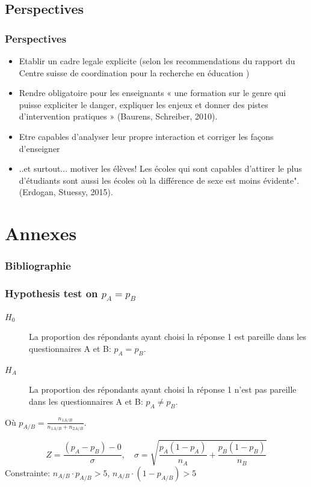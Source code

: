 \documentclass{beamer}
\begin{document}
\subsection{Perspectives}
\begin{frame}
  \frametitle{Perspectives}
  \begin{itemize}
  \item Etablir un cadre legale explicite (selon les recommendations du rapport du Centre suisse de coordination pour la recherche en éducation )
  \item Rendre obligatoire pour les enseignants « une formation sur le genre qui puisse expliciter le danger, expliquer les enjeux  et donner des pistes d’intervention pratiques » (Baurens, Schreiber, 2010). 
  \item Etre capables d’analyser leur propre interaction et corriger les façons d’enseigner 
  \item ..et surtout... motiver les élèves!  Les écoles qui sont capables d’attirer le plus d’étudiants sont aussi les écoles où la différence de sexe est  moins évidente". (Erdogan, Stuessy, 2015). 	  
  \end{itemize}
\end{frame}

\section{Annexes}
\begin{frame}
\frametitle{Bibliographie}
\end{frame}

\begin{frame}
  \frametitle{Hypothesis test on $p_A = p_B $}
  \begin{description}
  \item[$H_0$] La proportion des répondants ayant choisi la réponse 1 est
                pareille dans les questionnaires A et B: $p_A = p_B$. 
  \item[$H_A$] La proportion des répondants ayant choisi la réponse
                1 n’est pas  pareille dans les questionnaires A et B: $p_A \ne p_B$.
  \end{description}
  Où $p_{A/B}  = \frac{n_{1A/B}}{n_{1A/B}  + n_{2A/B}}$.

  \[
  Z = \frac{(p_A-p_B) - 0}{\sigma} ,\quad
  \sigma = \sqrt{\frac{p_A(1-p_A)}{n_A} + \frac{p_B(1-p_B)}{n_B}} 
  \]
  Constrainte: $n_{A/B} \cdot p_{A/B} > 5$, $n_{A/B} \cdot (1-p_{A/B}) > 5$ 
\end{frame}
\end{document}
